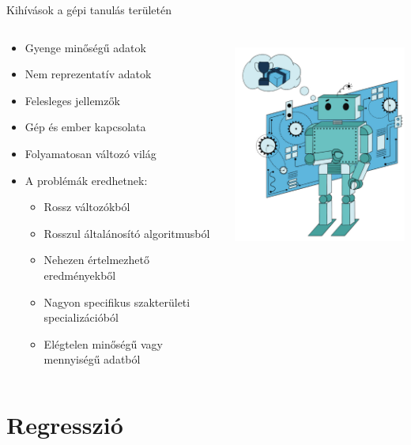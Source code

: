 \documentclass[english, aspectratio=169]{beamer}
\begin{document}
\begin{frame}{Kihívások a gépi tanulás területén}
\begin{columns}
\begin{column}{.5\textwidth}
\begin{itemize}
	\item Gyenge minőségű adatok
	\item Nem reprezentatív adatok
	\item Felesleges jellemzők
	\item Gép és ember kapcsolata
	\item Folyamatosan változó világ
	\item A problémák eredhetnek:
	\begin{itemize}
		\item Rossz változókból
		\item Rosszul általánosító algoritmusból
		\item Nehezen értelmezhető eredményekből
		\item Nagyon specifikus szakterületi specializációból
		\item Elégtelen minőségű vagy mennyiségű adatból
	\end{itemize}
\end{itemize}
\end{column}
\begin{column}{.5\textwidth}
\begin{center}
\includegraphics[width=7cm, height=7cm, keepaspectratio]{images/regresszio_9.png}
\end{center}
\end{column}
\end{columns}
\end{frame}

\section{Regresszió}
\end{document}
